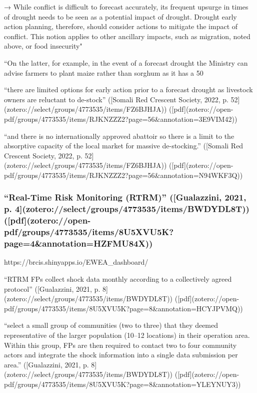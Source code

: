 {→ While conflict is difficult to forecast accurately, its frequent upsurge in times of drought needs to be seen as a potential impact of drought. Drought early action planning, therefore, should consider actions to mitigate the impact of conflict. This notion applies to other ancillary impacts, such as migration, noted above, or food insecurity"


“On the latter, for example, in the event of a forecast drought the Ministry can advise farmers to plant maize rather than sorghum as it has a 50%

“there are limited options for early action prior to a forecast drought as livestock owners are reluctant to de-stock” ([Somali Red Crescent Society, 2022, p. 52](zotero://select/groups/4773535/items/FZ6BJHJA)) ([pdf](zotero://open-pdf/groups/4773535/items/RJKNZZZ2?page=56&annotation=3E9VIM42))

“and there is no internationally approved abattoir so there is a limit to the absorptive capacity of the local market for massive de-stocking.” ([Somali Red Crescent Society, 2022, p. 52](zotero://select/groups/4773535/items/FZ6BJHJA)) ([pdf](zotero://open-pdf/groups/4773535/items/RJKNZZZ2?page=56&annotation=N94WKF3Q))

\subsubsection{“Real-Time Risk Monitoring (RTRM)” ([Gualazzini, 2021, p. 4](zotero://select/groups/4773535/items/BWDYDL8T)) ([pdf](zotero://open-pdf/groups/4773535/items/8U5XVU5K?page=4&annotation=HZFMU84X))} %



https://brcis.shinyapps.io/EWEA_dashboard/

“RTRM FPs collect shock data monthly according to a collectively agreed protocol” ([Gualazzini, 2021, p. 8](zotero://select/groups/4773535/items/BWDYDL8T)) ([pdf](zotero://open-pdf/groups/4773535/items/8U5XVU5K?page=8&annotation=HCYJPVMQ))

“select a small group of communities (two to three) that they deemed representative of the larger population (10–12 locations) in their operation area. Within this group, FPs are then required to contact two to four community actors and integrate the shock information into a single data submission per area.” ([Gualazzini, 2021, p. 8](zotero://select/groups/4773535/items/BWDYDL8T)) ([pdf](zotero://open-pdf/groups/4773535/items/8U5XVU5K?page=8&annotation=YLEYNUY3))

}
